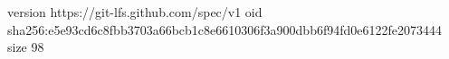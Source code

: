 version https://git-lfs.github.com/spec/v1
oid sha256:e5e93cd6c8fbb3703a66bcb1c8e6610306f3a900dbb6f94fd0e6122fe2073444
size 98
